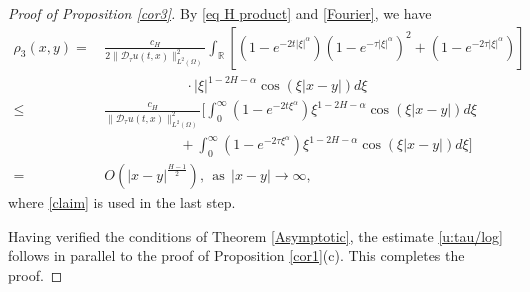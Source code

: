 \documentclass[11pt,reqno]{amsart}
\numberwithin{equation}{section}
\def\RR{\mathbb{R}}
\newcommand{\1}{{\bf 1}}
\newcommand{\2}{{\bf 2}}
\begin{document}
\begin{proof}[Proof of  Proposition \ref{cor3}]
By \eqref{eq H product} and \eqref{Fourier},  we have
\begin{equation*}
\begin{split}
\rho_3(x,y)
=&\, \frac{c_{H}}{2\|\mathcal D_{\tau}u(t,x)\|_{L^2(\Omega)}^2}
\int_{\RR}\left[ \left(1-e^{-2t|\xi|^\alpha}\right)\left(1-e^{-\tau|\xi|^\alpha}\right)^2
+\left( 1-e^{-2\tau|\xi|^\alpha}\right) \right] \\
&\ \ \ \ \ \ \ \ \ \ \ \ \ \ \ \ \ \ \ \ \ \ \ \ \ \ \
    \cdot|\xi|^{1-2H-\alpha}\cos(\xi|x-y|)d\xi \\
\leq&\, \frac{c_{H}}{\|\mathcal D_{\tau}u(t,x)\|_{L^2(\Omega)}^2}
\Bigg[\int_0^\infty\left(1-e^{-2t\xi^\alpha}\right)\xi^{1-2H-\alpha}\cos(\xi|x-y|)d\xi \\
&\ \ \ \ \ \ \ \ \ \ \ \ \ \ \ \ \ \ \ \ \ \ \ \ \ +\int_0^\infty\left(1-e^{-2\tau\xi^\alpha}\right)\xi^{1-2H-\alpha}\cos(\xi|x-y|)d\xi\Bigg] \\
=&\, O\left(|x-y|^{\frac{H-1}{2}}\right),\ \ \text{as}\ \ |x-y|\rightarrow\infty,
\end{split}
\end{equation*}
where  \eqref{claim} is used in the last step.
 

Having verified the conditions of Theorem \ref{Asymptotic}, the estimate \eqref{u:tau/log} follows    in parallel to the proof of Proposition \ref{cor1}(c). This completes the proof.
\end{proof}
\end{document}
